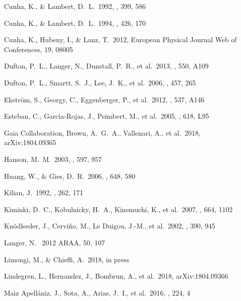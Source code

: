 \documentclass{aa} %
\begin{document}
\begin{thebibliography}{}
	 Cunha, K., \& Lambert, D.~L.\ 1992, \apj, 399, 586
	
     Cunha, K., \& Lambert, D.~L.\ 1994, \apj, 426, 170 
    
     Cunha, K., Hubeny, I., \& Lanz, T.\ 2012, European Physical Journal Web of Conferences, 19, 08005
    
     Dufton, P.~L., Langer, N., Dunstall, P.~R., et al.\ 2013, \aap, 550, A109 
    
	  Dufton, P.~L., Smartt, S.~J., Lee, J.~K., et al.\ 2006, \aap, 457, 265    
 
     Ekstr{\"o}m, S., Georgy, C., Eggenberger, P., et al.\ 2012, \aap, 537, A146
    
         Esteban, C., Garc{\'{\i}}a-Rojas, J., Peimbert, M., et al.\ 2005, \apjl, 618, L95 
        
     Gaia Collaboration, Brown, A.~G.~A., Vallenari, A., et al.\ 2018, arXiv:1804.09365

	 Hanson, M.~M.\ 2003, \apj, 597, 957
	
	 Huang, W., \& Gies, D.~R.\ 2006, \apj, 648, 580

	 Kilian, J.\ 1992, \aap, 262, 171 
	
    Kiminki, D.~C., Kobulnicky, H.~A., Kinemuchi, K., et al.\ 2007, \apj, 664, 1102  
      
   Kn{\"o}dlseder, J., Cervi{\~n}o, M., Le Duigou, J.-M., et al.\ 2002, \aap, 390, 945    
	
    Langer, N. \ 2012 ARAA, 50, 107
   

	 Limongi, M., \& Chieffi, A.\ 2018, in press 	

	 Lindegren, L., Hernandez, J., Bombrun, A., et al.\ 2018, arXiv:1804.09366 
    
	 Ma{\'{\i}}z Apell{\'a}niz, J., Sota, A., Arias, J.~I., et al.\ 2016, \apjs, 224, 4	
    

\end{thebibliography}
\end{document}
